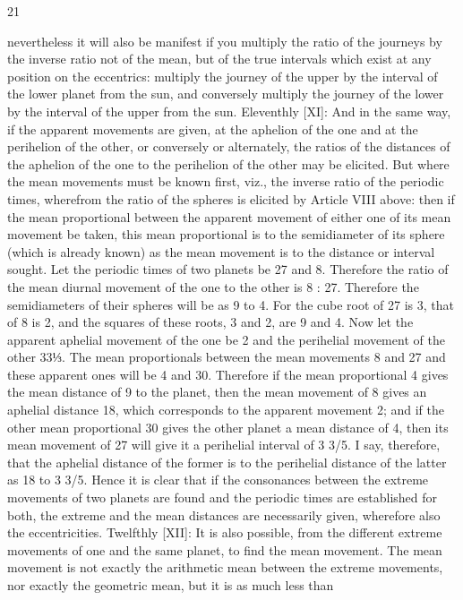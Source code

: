 \documentclass{article}
\begin{document}
21

nevertheless it will also be manifest if you multiply the ratio of the
journeys by the inverse ratio not of the mean, but of the true intervals
which exist at any position on the eccentrics: multiply the journey of the
upper by the interval of the lower planet from the sun, and conversely
multiply the journey of the lower by the interval of the upper from the
sun.
Eleventhly [XI]: And in the same way, if the apparent movements are
given, at the aphelion of the one and at the perihelion of the other, or
conversely or alternately, the ratios of the distances of the aphelion of the
one to the perihelion of the other may be elicited. But where the mean
movements must be known first, viz., the inverse ratio of the periodic
times, wherefrom the ratio of the spheres is elicited by Article VIII
above: then if the mean proportional between the apparent movement
of either one of its mean movement be taken, this mean proportional is
to the semidiameter of its sphere (which is already known) as the mean
movement is to the distance or interval sought. Let the periodic times of
two planets be 27 and 8. Therefore the ratio of the mean diurnal
movement of the one to the other is 8 : 27. Therefore the semidiameters
of their spheres will be as 9 to 4. For the cube root of 27 is 3, that of 8 is
2, and the squares of these roots, 3 and 2, are 9 and 4. Now let the
apparent aphelial movement of the one be 2 and the perihelial
movement of the other 33⅓. The mean proportionals between the mean
movements 8 and 27 and these apparent ones will be 4 and 30.
Therefore if the mean proportional 4 gives the mean distance of 9 to the
planet, then the mean movement of 8 gives an aphelial distance 18,
which corresponds to the apparent movement 2; and if the other mean
proportional 30 gives the other planet a mean distance of 4, then its
mean movement of 27 will give it a perihelial interval of 3 3/5. I say,
therefore, that the aphelial distance of the former is to the perihelial
distance of the latter as 18 to 3 3/5. Hence it is clear that if the
consonances between the extreme movements of two planets are found
and the periodic times are established for both, the extreme and the
mean distances are necessarily given, wherefore also the eccentricities.
Twelfthly [XII]: It is also possible, from the different extreme
movements of one and the same planet, to find the mean movement. The
mean movement is not exactly the arithmetic mean between the extreme
movements, nor exactly the geometric mean, but it is as much less than
\end{document}

